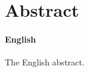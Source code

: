 \chapter*{Abstract}
\makeatletter{}\makeatother

\subsubsection*{English}

The English abstract.



